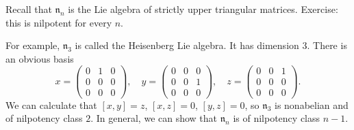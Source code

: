 Recall that $\mathfrak{n}_n$ is the Lie algebra of strictly upper triangular matrices.
Exercise: this is nilpotent for every $n$.

For example, $\mathfrak{n}_3$ is called the Heisenberg Lie algebra. It has dimension
$3$. There is an obvious basis
\[
	x=\begin{pmatrix}0&1&0\\0&0&0\\0&0&0\end{pmatrix},\quad
	y=\begin{pmatrix}0&0&0\\0&0&1\\0&0&0\end{pmatrix},\quad
	z=\begin{pmatrix}0&0&1\\0&0&0\\0&0&0\end{pmatrix}.
\]
We can calculate that $[x, y] = z$, $[x, z] = 0$, $[y, z] = 0$, so $\mathfrak{n}_3$
is nonabelian and of nilpotency class $2$. In general, we can show that
$\mathfrak{n}_n$ is of nilpotency class $n-1$.

